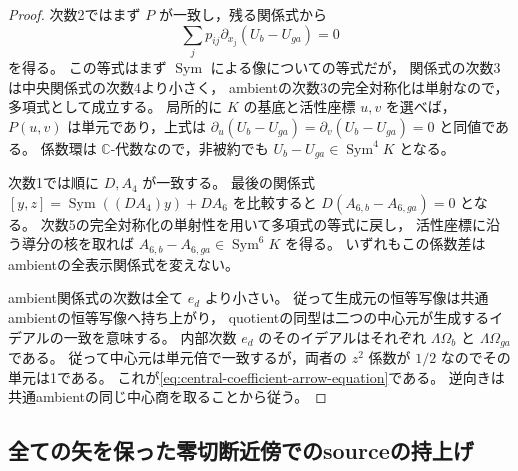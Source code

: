 \begin{proof}
次数2ではまず $P$ が一致し，残る関係式から
\[
     \sum_jp_{ij}\partial_{x_j}(U_b-U_{ga})=0
\]
を得る。
この等式はまず $\operatorname{Sym}$ による像についての等式だが，
関係式の次数3は中央関係式の次数4より小さく，
ambientの次数3の完全対称化は単射なので，多項式として成立する。
局所的に $K$ の基底と活性座標 $u,v$ を選べば，
$P(u,v)$ は単元であり，上式は $\partial_u(U_b-U_{ga})=
\partial_v(U_b-U_{ga})=0$ と同値である。
係数環は $\mathbb C$-代数なので，非被約でも
$U_b-U_{ga}\in\operatorname{Sym}^4K$ となる。

次数1では順に $D,A_4$ が一致する。
最後の関係式 $[y,z]=\operatorname{Sym}((DA_4)y)+DA_6$ を比較すると
$D(A_{6,b}-A_{6,ga})=0$ となる。
次数5の完全対称化の単射性を用いて多項式の等式に戻し，
活性座標に沿う導分の核を取れば
$A_{6,b}-A_{6,ga}\in\operatorname{Sym}^6K$ を得る。
いずれもこの係数差はambientの全表示関係式を変えない。

ambient関係式の次数は全て $e_d$ より小さい。
従って生成元の恒等写像は共通ambientの恒等写像へ持ち上がり，
quotientの同型は二つの中心元が生成するイデアルの一致を意味する。
内部次数 $e_d$ のそのイデアルはそれぞれ $\Lambda\Omega_b$ と
$\Lambda\Omega_{ga}$ である。
従って中心元は単元倍で一致するが，両者の $z^2$ 係数が $1/2$ なのでその単元は1である。
これが\eqref{eq:central-coefficient-arrow-equation}である。
逆向きは共通ambientの同じ中心商を取ることから従う。
\end{proof}

\subsection{全ての矢を保った零切断近傍でのsourceの持上げ}

